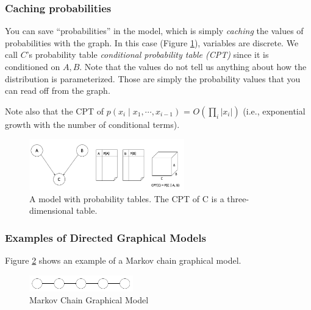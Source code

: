 \documentclass{article}
\begin{document}
\subsubsection{Caching probabilities}
You can save ``probabilities'' in the model, which is simply \emph{caching} the values of probabilities with the graph. 
In this case (Figure \ref{fig:nb5}), variables are discrete. We call $C$'s probability table \emph{conditional probability table (CPT)} since it is conditioned on $A, B$. Note that the values do not tell us anything about how the distribution is parameterized. Those are simply the probability values that you can read off from the graph.

Note also that the CPT of $p(x_{i} \mid x_{1}, \cdots, x_{i - 1})$ = $O(\prod_{i} |x_{i} |)$ (i.e., exponential growth with the number of conditional terms). 
\begin{figure}[!ht]
    \centering
    \includegraphics[width = 0.6\textwidth]{nb5.png}
    \caption{A model with probability tables. The CPT of C is a three-dimensional table.}
    \label{fig:nb5}
\end{figure}



\FloatBarrier
\subsubsection{Examples of Directed Graphical Models}
\begin{example}
Figure \ref{fig:nb6} shows an example of a Markov chain graphical model.
\begin{figure}[!ht]
    \centering
    \includegraphics[width = 0.4\textwidth]{nb6.png}
    \caption{Markov Chain Graphical Model}
    \label{fig:nb6}
\end{figure}
\end{example}
\end{document}
